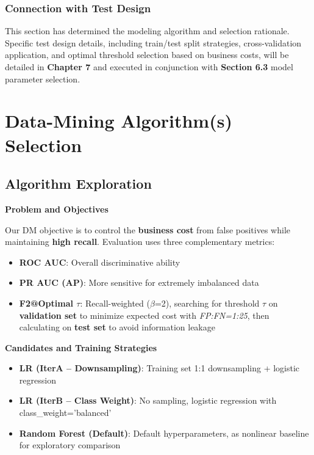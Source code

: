 \documentclass[sigplan,screen]{acmart}
\begin{document}
\subsubsection{Connection with Test Design}

This section has determined the modeling algorithm and selection rationale. Specific test design details, including train/test split strategies, cross-validation application, and optimal threshold selection based on business costs, will be detailed in \textbf{Chapter 7} and executed in conjunction with \textbf{Section 6.3} model parameter selection.

\section{Data-Mining Algorithm(s) Selection}

\subsection{Algorithm Exploration}

\textbf{Problem and Objectives}

Our DM objective is to control the \textbf{business cost} from false positives while maintaining \textbf{high recall}. Evaluation uses three complementary metrics:

\begin{itemize}
\item \textbf{ROC AUC}: Overall discriminative ability
\item \textbf{PR AUC (AP)}: More sensitive for extremely imbalanced data \citep{saito2015precision}
\item \textbf{F2@Optimal $\tau$}: Recall-weighted ($\beta$=2), searching for threshold $\tau$ on \textbf{validation set} to minimize expected cost with \textit{FP:FN=1:25}, then calculating on \textbf{test set} to avoid information leakage
\end{itemize}

\textbf{Candidates and Training Strategies}

\begin{itemize}
\item \textbf{LR (IterA -- Downsampling)}: Training set 1:1 downsampling + logistic regression
\item \textbf{LR (IterB -- Class Weight)}: No sampling, logistic regression with class\_weight='balanced'
\item \textbf{Random Forest (Default)}: Default hyperparameters, as nonlinear baseline for exploratory comparison
\end{itemize}
\end{document}
